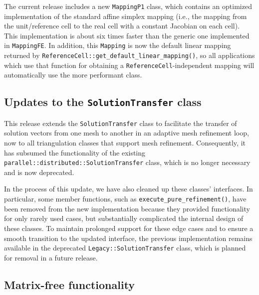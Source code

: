 \documentclass{ansarticle-preprint}
\begin{document}
The current
release includes a new \texttt{MappingP1} class, which contains an optimized
implementation of the standard affine simplex mapping (i.e., the mapping from
the unit/reference cell to the real cell with a constant Jacobian on each cell). This
implementation is about six times faster than the generic one implemented in
\texttt{MappingFE}. In addition, this \texttt{Mapping} is now the default linear
mapping returned by \texttt{ReferenceCell::get\_default\_linear\_mapping()}, so
all applications which use that function for obtaining a
\texttt{ReferenceCell}-independent mapping will automatically use the more
performant class.

\subsection{Updates to the \texttt{SolutionTransfer} class}
\label{subsec:solutiontransfer}
This release extends the \texttt{SolutionTransfer} class to facilitate
the transfer of solution vectors from one mesh to another in an
adaptive mesh refinement loop, now to
all triangulation classes that support mesh refinement.
Consequently, it has subsumed the functionality of the existing
\texttt{parallel::distributed::SolutionTransfer} class, which is no
longer necessary and is now deprecated.

In the process of this update, we have also cleaned up these classes'
interfaces. In particular, some member functions, such as
\texttt{execute\_pure\_refinement()}, have been removed from the new
implementation because they provided functionality for only rarely
used cases, but substantially complicated the internal design of these
classes. To maintain prolonged support for these edge cases and to ensure
a smooth transition to the updated interface, the previous implementation
remains available in the deprecated \texttt{Legacy::SolutionTransfer} class,
which is planned for removal in a future release.


\subsection{Matrix-free functionality}
\label{subsec:matrixfree}
\end{document}
